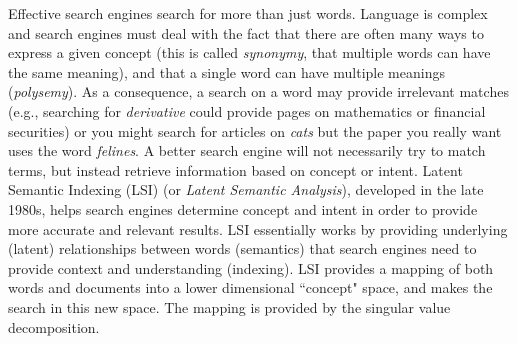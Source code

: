  \label{sec:SVD}

\vspace*{-17 pt}

\vspace*{13 pt}


Effective search engines search for more than just words. Language is complex and search engines must deal with the fact that there are often many ways to express a given concept (this is called \emph{synonymy}, that multiple words can have the same meaning), and that a single word can have multiple meanings (\emph{polysemy}). As a consequence, a search on a word may provide irrelevant matches (e.g., searching for \emph{derivative} could provide pages on mathematics or financial securities) or you might search for articles on \emph{cats} but the paper you really want uses the word \emph{felines}.  A better search engine will not necessarily try to match terms, but instead retrieve information based on concept or intent. Latent Semantic Indexing (LSI) (or \emph{Latent Semantic Analysis}), developed in the late 1980s, helps search engines determine concept and intent in order to provide more accurate and relevant results. LSI essentially works by providing underlying (latent) relationships between words (semantics) that search engines need to provide context and understanding (indexing). LSI provides a mapping of both words and documents into a lower dimensional  ``concept" space, and makes the search in this new space. The mapping is provided by the  singular value decomposition. 


